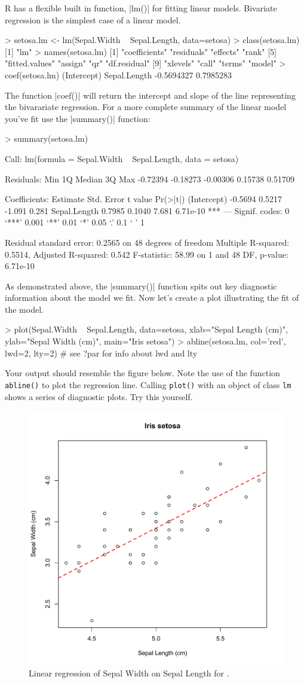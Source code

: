 R has a flexible built in function, |lm()| for fitting linear models. Bivariate regression is the simplest case of a linear model.
%
\begin{R}
> setosa.lm <- lm(Sepal.Width ~ Sepal.Length, data=setosa)
> class(setosa.lm)
[1] "lm"
> names(setosa.lm)
 [1] "coefficients"  "residuals"     "effects"       "rank"
 [5] "fitted.values" "assign"        "qr"            "df.residual"
 [9] "xlevels"       "call"          "terms"         "model"
> coef(setosa.lm)
 (Intercept) Sepal.Length 
  -0.5694327    0.7985283 
\end{R}
The function |coef()| will return the intercept and slope of the line representing the bivarariate regression. For a more complete summary of the linear model you've fit use the |summary()| function:
\begin{R}
> summary(setosa.lm)

Call:
lm(formula = Sepal.Width ~ Sepal.Length, data = setosa)

Residuals:
     Min       1Q   Median       3Q      Max
-0.72394 -0.18273 -0.00306  0.15738  0.51709

Coefficients:
             Estimate Std. Error t value Pr(>|t|)
(Intercept)   -0.5694     0.5217  -1.091    0.281
Sepal.Length   0.7985     0.1040   7.681 6.71e-10 ***
---
Signif. codes:  0 ‘***’ 0.001 ‘**’ 0.01 ‘*’ 0.05 ‘.’ 0.1 ‘ ’ 1

Residual standard error: 0.2565 on 48 degrees of freedom
Multiple R-squared: 0.5514, Adjusted R-squared: 0.542
F-statistic: 58.99 on 1 and 48 DF,  p-value: 6.71e-10
\end{R}
%
As demonstrated above, the |summary()| function spits out key diagnostic information about the model we fit.  Now let's create a plot illustrating the fit of the model.
%
\begin{R}
> plot(Sepal.Width ~ Sepal.Length, data=setosa, xlab="Sepal Length (cm)", ylab="Sepal Width (cm)", main="Iris setosa")
> abline(setosa.lm, col='red', lwd=2, lty=2)  # see ?par for info about lwd and lty
\end{R}
Your output should resemble the figure below. Note the use of the function \lstinline!abline()! to plot the regression
line. Calling \lstinline!plot()! with an object of class \lstinline!lm!
shows a series of diagnostic plots. Try this yourself.
%
\begin{figure}[htbp]
\centering
\includegraphics[width=0.5\columnwidth]{./figures/hands-on2/regression.pdf}
\caption{Linear regression of Sepal Width on Sepal Length for .}
\end{figure}

